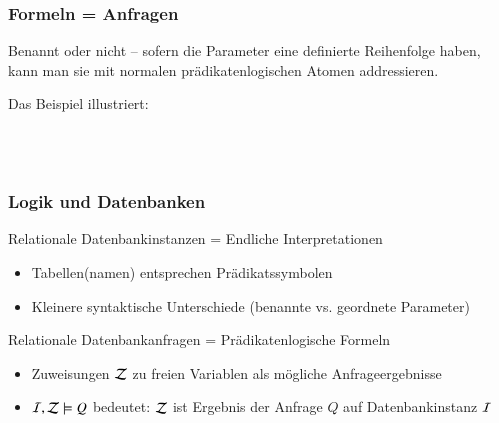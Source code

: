 \documentclass[aspectratio=1610,onlymath]{beamer}
\begin{document}
\begin{frame}\frametitle{Formeln = Anfragen}

Benannt oder nicht -- sofern die Parameter eine definierte Reihenfolge haben,
kann man sie mit normalen prädikatenlogischen Atomen addressieren.\medskip

\pause

Das Beispiel illustriert:
\begin{center}
\large
{}\\[1ex]
\\
\end{center}
\end{frame}

\begin{frame}\frametitle{Logik und Datenbanken}

\alert{Relationale Datenbankinstanzen = Endliche Interpretationen}
\begin{itemize}
\item Tabellen(namen) entsprechen Prädikatssymbolen
\item Kleinere syntaktische Unterschiede (benannte vs. geordnete Parameter)
\end{itemize}

\alert{Relationale Datenbankanfragen = Prädikatenlogische Formeln}
\begin{itemize}
\item Zuweisungen $\mathcal{Z}$ zu freien Variablen als mögliche Anfrageergebnisse
\item $\mathcal{I},\mathcal{Z}\models Q$ bedeutet: $\mathcal{Z}$ ist Ergebnis der Anfrage $Q$ auf Datenbankinstanz $\mathcal{I}$
\end{itemize}


\end{frame}
\end{document}
